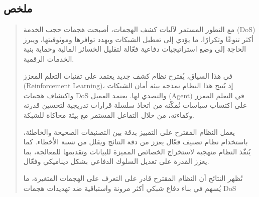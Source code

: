 \documentclass[12pt]{report}
\begin{document}
\newpage
\begin{otherlanguage}{arabic}
\chapter*{ملخص}

\begin{quote}
\large
مع التطور المستمر لآليات كشف الهجمات، أصبحت هجمات حجب الخدمة (DoS) أكثر تنوعًا وتكرارًا، ما يؤدي إلى تعطيل الشبكات ويهدد توافرها وموثوقيتها، ويبرز الحاجة إلى وضع استراتيجيات دفاعية فعّالة لتقليل الخسائر المالية وحماية بنية الخدمات الرقمية.

في هذا السياق، يُقترح نظام كشف جديد يعتمد على تقنيات التعلم المعزز (Reinforcement Learning)، إذ يُتيح هذا النظام نمذجة بيئة أمان الشبكات واكتشاف هجمات DoS والتصدي لها. يعتمد العميل (Agent) في التعلم المعزز على اكتساب سياسات تُمكّنه من اتخاذ سلسلة قرارات تدريجية لتحسين قدرته وكفاءته، من خلال التفاعل المستمر مع بيئة محاكاة للشبكة.

يعمل النظام المقترح على التمييز بدقة بين التصنيفات الصحيحة والخاطئة، باستخدام نظام تصنيف فعّال يعزز من دقة النتائج ويقلل من نسبة الأخطاء. كما يُنفّذ النظام منهجية لاستخراج الخصائص المميزة للبيانات وتقديمها للمعالجة، بما يعزز القدرة على تعديل السلوك الدفاعي بشكل ديناميكي وفعّال.

تُظهر النتائج أن النظام المقترح قادر على التعرف على الهجمات المتغيرة، ما يُسهم في بناء دفاع شبكي أكثر مرونة واستباقية ضد تهديدات هجمات DoS
\end{quote}

\vspace{1em}
\end{otherlanguage}
\end{document}
